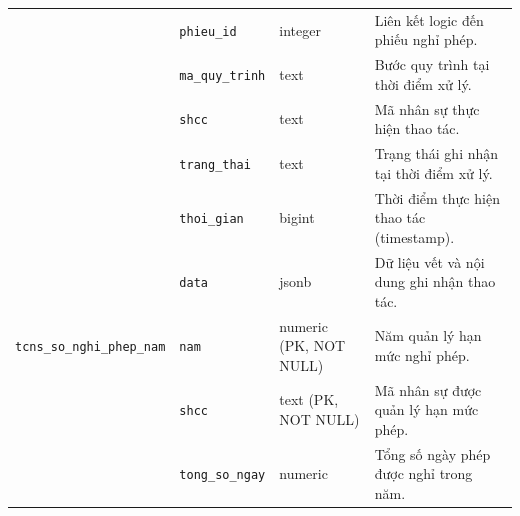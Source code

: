 \begin{xltabular}{\textwidth}{|L{2.7cm}|L{2.6cm}|L{4.2cm}|Y|}
 & \texttt{phieu\_id} & integer & Liên kết logic đến phiếu nghỉ phép. \\
 & \texttt{ma\_quy\_trinh} & text & Bước quy trình tại thời điểm xử lý. \\
 & \texttt{shcc} & text & Mã nhân sự thực hiện thao tác. \\
 & \texttt{trang\_thai} & text & Trạng thái ghi nhận tại thời điểm xử lý. \\
 & \texttt{thoi\_gian} & bigint & Thời điểm thực hiện thao tác (timestamp). \\
 & \texttt{data} & jsonb & Dữ liệu vết và nội dung ghi nhận thao tác. \\
\hline
\texttt{tcns\_so\_nghi\_phep\_nam} & \texttt{nam} & numeric (PK, NOT NULL) & Năm quản lý hạn mức nghỉ phép. \\
 & \texttt{shcc} & text (PK, NOT NULL) & Mã nhân sự được quản lý hạn mức phép. \\
 & \texttt{tong\_so\_ngay} & numeric & Tổng số ngày phép được nghỉ trong năm. \\
\end{xltabular}
